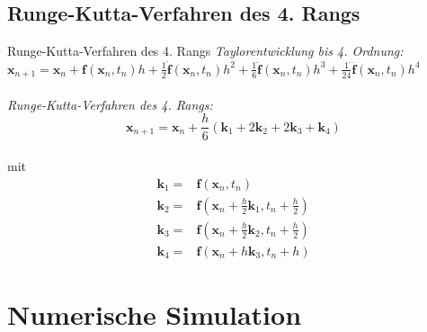 \documentclass{beamer}
\begin{document}
\subsection{Runge-Kutta-Verfahren des 4. Rangs}
	\begin{frame}{Runge-Kutta-Verfahren des 4. Rangs}
	\textit{Taylorentwicklung bis 4. Ordnung:}\\$ \textbf{x}_{n+1}=\textbf{x}_n+\textbf{f}(\textbf{x}_n,t_n)h+\frac{1}{2}\dot{\textbf{f}}(\textbf{x}_n,t_n)h^2+\frac{1}{6}\ddot{\textbf{f}}(\textbf{x}_n,t_n)h^3+\frac{1}{24}\dddot{\textbf{f}}(\textbf{x}_n,t_n)h^4$\\~\\
	\pause
	\textit{Runge-Kutta-Verfahren des 4. Rangs:}\\$$ \textbf{x}_{n+1}=\textbf{x}_n+\frac{h}{6}(\textbf{k}_1+2\textbf{k}_2+2\textbf{k}_3+\textbf{k}_4)$$\\
	mit \begin{align*}
	\textbf{k}_1=&\textbf{f}(\textbf{x}_n,t_n)\\
		\textbf{k}_2=&\textbf{f}(\textbf{x}_n+\frac{h}{2}\textbf{k}_1,t_n+\frac{h}{2})\\
	\textbf{k}_3=&\textbf{f}(\textbf{x}_n+\frac{h}{2}\textbf{k}_2,t_n+\frac{h}{2})\\
	\textbf{k}_4=&\textbf{f}(\textbf{x}_n+h\textbf{k}_3,t_n+h)	
	\end{align*}
	\end{frame}

\section{Numerische Simulation}
\end{document}
